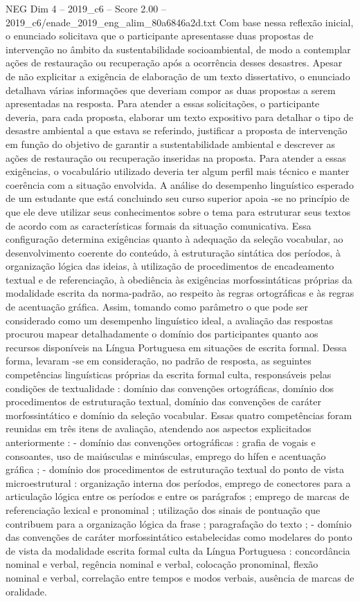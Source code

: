 \begin{textsample}{NEG Dim 4 – 2019\_c6 – Score 2.00 – 2019\_c6/enade\_2019\_eng\_alim\_80a6846a2d.txt}
Com base nessa reflexão inicial, o enunciado solicitava que o participante apresentasse duas propostas de intervenção no âmbito da sustentabilidade socioambiental, de modo a contemplar ações de restauração ou recuperação após a ocorrência desses desastres.
Apesar de não explicitar a exigência de elaboração de um texto dissertativo, o enunciado detalhava várias informações que deveriam compor as duas propostas a serem apresentadas na resposta.
Para atender a essas solicitações, o participante deveria, para cada proposta, elaborar um texto expositivo para detalhar o tipo de desastre ambiental a que estava se referindo, justificar a proposta de intervenção em função do objetivo de garantir a sustentabilidade ambiental e descrever as ações de restauração ou recuperação inseridas na proposta.
Para atender a essas exigências, o vocabulário utilizado deveria ter algum perfil mais técnico e manter coerência com a situação envolvida.
A análise do desempenho linguístico esperado de um estudante que está concluindo seu curso superior apoia -se no princípio de que ele deve utilizar seus conhecimentos sobre o tema para estruturar seus textos de acordo com as características formais da situação comunicativa.
Essa configuração determina exigências quanto à adequação da seleção vocabular, ao desenvolvimento coerente do conteúdo, à estruturação sintática dos períodos, à organização lógica das ideias, à utilização de procedimentos de encadeamento textual e de referenciação, à obediência às exigências morfossintáticas próprias da modalidade escrita da norma-padrão, ao respeito às regras ortográficas e às regras de acentuação gráfica.
Assim, tomando como parâmetro o que pode ser considerado como um desempenho linguístico ideal, a avaliação das respostas procurou mapear detalhadamente o domínio dos participantes quanto aos recursos disponíveis na Língua Portuguesa em situações de escrita formal.
Dessa forma, levaram -se em consideração, no padrão de resposta, as seguintes competências linguísticas próprias da escrita formal culta, responsáveis pelas condições de textualidade : domínio das convenções ortográficas, domínio dos procedimentos de estruturação textual, domínio das convenções de caráter morfossintático e domínio da seleção vocabular.
Essas quatro competências foram reunidas em três itens de avaliação, atendendo aos aspectos explicitados anteriormente : - domínio das convenções ortográficas : grafia de vogais e consoantes, uso de maiúsculas e minúsculas, emprego do hífen e acentuação gráfica ; - domínio dos procedimentos de estruturação textual do ponto de vista microestrutural : organização interna dos períodos, emprego de conectores para a articulação lógica entre os períodos e entre os parágrafos ; emprego de marcas de referenciação lexical e pronominal ; utilização dos sinais de pontuação que contribuem para a organização lógica da frase ; paragrafação do texto ; - domínio das convenções de caráter morfossintático estabelecidas como modelares do ponto de vista da modalidade escrita formal culta da Língua Portuguesa : concordância nominal e verbal, regência nominal e verbal, colocação pronominal, flexão nominal e verbal, correlação entre tempos e modos verbais, ausência de marcas de oralidade.

\end{textsample}

